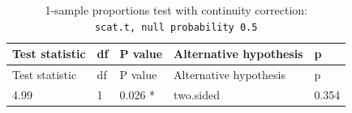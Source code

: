 \documentclass[]{tufte-handout}
\begin{document}
\begin{longtable}[]{@{}lllll@{}}
\caption{1-sample proportions test with continuity correction:
\texttt{scat.t,\ null\ probability\ 0.5}}\tabularnewline
\toprule
\begin{minipage}[b]{0.20\columnwidth}\raggedright\strut
Test statistic\strut
\end{minipage} & \begin{minipage}[b]{0.06\columnwidth}\raggedright\strut
df\strut
\end{minipage} & \begin{minipage}[b]{0.12\columnwidth}\raggedright\strut
P value\strut
\end{minipage} & \begin{minipage}[b]{0.30\columnwidth}\raggedright\strut
Alternative hypothesis\strut
\end{minipage} & \begin{minipage}[b]{0.08\columnwidth}\raggedright\strut
p\strut
\end{minipage}\tabularnewline
\midrule
\endfirsthead
\toprule
\begin{minipage}[b]{0.20\columnwidth}\raggedright\strut
Test statistic\strut
\end{minipage} & \begin{minipage}[b]{0.06\columnwidth}\raggedright\strut
df\strut
\end{minipage} & \begin{minipage}[b]{0.12\columnwidth}\raggedright\strut
P value\strut
\end{minipage} & \begin{minipage}[b]{0.30\columnwidth}\raggedright\strut
Alternative hypothesis\strut
\end{minipage} & \begin{minipage}[b]{0.08\columnwidth}\raggedright\strut
p\strut
\end{minipage}\tabularnewline
\midrule
\endhead
\begin{minipage}[t]{0.20\columnwidth}\raggedright\strut
4.99\strut
\end{minipage} & \begin{minipage}[t]{0.06\columnwidth}\raggedright\strut
1\strut
\end{minipage} & \begin{minipage}[t]{0.12\columnwidth}\raggedright\strut
0.026 *\strut
\end{minipage} & \begin{minipage}[t]{0.30\columnwidth}\raggedright\strut
two.sided\strut
\end{minipage} & \begin{minipage}[t]{0.08\columnwidth}\raggedright\strut
0.354\strut
\end{minipage}\tabularnewline
\bottomrule
\end{longtable}
\end{document}
